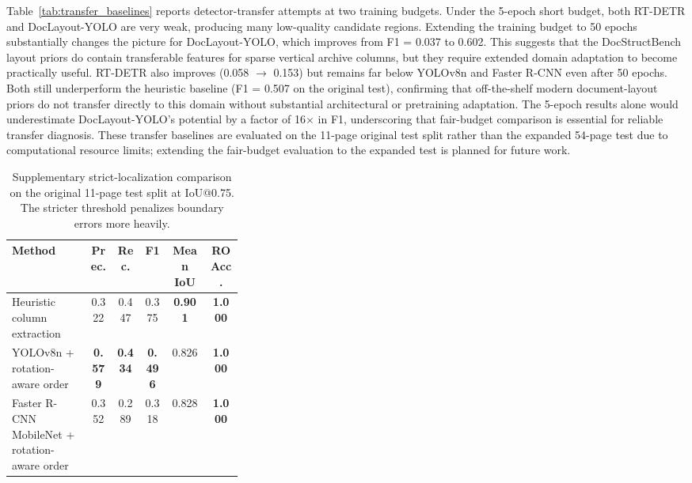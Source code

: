 \documentclass[pdflatex,sn-mathphys-num]{sn-jnl}
\begin{document}
Table~\ref{tab:transfer_baselines} reports detector-transfer attempts at two training budgets. Under the 5-epoch short budget, both RT-DETR and DocLayout-YOLO are very weak, producing many low-quality candidate regions. Extending the training budget to 50 epochs substantially changes the picture for DocLayout-YOLO, which improves from F1 = 0.037 to 0.602. This suggests that the DocStructBench layout priors do contain transferable features for sparse vertical archive columns, but they require extended domain adaptation to become practically useful. RT-DETR also improves (0.058 $\to$ 0.153) but remains far below YOLOv8n and Faster R-CNN even after 50 epochs. Both still underperform the heuristic baseline (F1 = 0.507 on the original test), confirming that off-the-shelf modern document-layout priors do not transfer directly to this domain without substantial architectural or pretraining adaptation. The 5-epoch results alone would underestimate DocLayout-YOLO's potential by a factor of 16$\times$ in F1, underscoring that fair-budget comparison is essential for reliable transfer diagnosis. These transfer baselines are evaluated on the 11-page original test split rather than the expanded 54-page test due to computational resource limits; extending the fair-budget evaluation to the expanded test is planned for future work.


\begin{table}[t]
\centering
\scriptsize\setlength{\tabcolsep}{3pt}
\caption{Supplementary strict-localization comparison on the original 11-page test split at IoU@0.75. The stricter threshold penalizes boundary errors more heavily.}
\label{tab:iou75}
\begin{tabular}{p{0.34\linewidth}ccccc}
\toprule
Method & Prec. & Rec. & F1 & Mean IoU & RO Acc. \\
\midrule
Heuristic column extraction & 0.322 & 0.447 & 0.375 & \textbf{0.901} & \textbf{1.000} \\
YOLOv8n + rotation-aware order & \textbf{0.579} & \textbf{0.434} & \textbf{0.496} & 0.826 & \textbf{1.000} \\
Faster R-CNN MobileNet + rotation-aware order & 0.352 & 0.289 & 0.318 & 0.828 & \textbf{1.000} \\
\bottomrule
\end{tabular}
\end{table}
\end{document}
